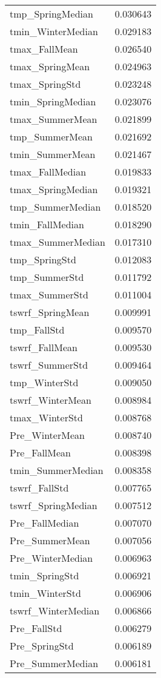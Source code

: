\begin{tabular}{lr}
tmp_SpringMedian & 0.030643 \\
tmin_WinterMedian & 0.029183 \\
tmax_FallMean & 0.026540 \\
tmax_SpringMean & 0.024963 \\
tmax_SpringStd & 0.023248 \\
tmin_SpringMedian & 0.023076 \\
tmax_SummerMean & 0.021899 \\
tmp_SummerMean & 0.021692 \\
tmin_SummerMean & 0.021467 \\
tmax_FallMedian & 0.019833 \\
tmax_SpringMedian & 0.019321 \\
tmp_SummerMedian & 0.018520 \\
tmin_FallMedian & 0.018290 \\
tmax_SummerMedian & 0.017310 \\
tmp_SpringStd & 0.012083 \\
tmp_SummerStd & 0.011792 \\
tmax_SummerStd & 0.011004 \\
tswrf_SpringMean & 0.009991 \\
tmp_FallStd & 0.009570 \\
tswrf_FallMean & 0.009530 \\
tswrf_SummerStd & 0.009464 \\
tmp_WinterStd & 0.009050 \\
tswrf_WinterMean & 0.008984 \\
tmax_WinterStd & 0.008768 \\
Pre_WinterMean & 0.008740 \\
Pre_FallMean & 0.008398 \\
tmin_SummerMedian & 0.008358 \\
tswrf_FallStd & 0.007765 \\
tswrf_SpringMedian & 0.007512 \\
Pre_FallMedian & 0.007070 \\
Pre_SummerMean & 0.007056 \\
Pre_WinterMedian & 0.006963 \\
tmin_SpringStd & 0.006921 \\
tmin_WinterStd & 0.006906 \\
tswrf_WinterMedian & 0.006866 \\
Pre_FallStd & 0.006279 \\
Pre_SpringStd & 0.006189 \\
Pre_SummerMedian & 0.006181 \\

\end{tabular}
